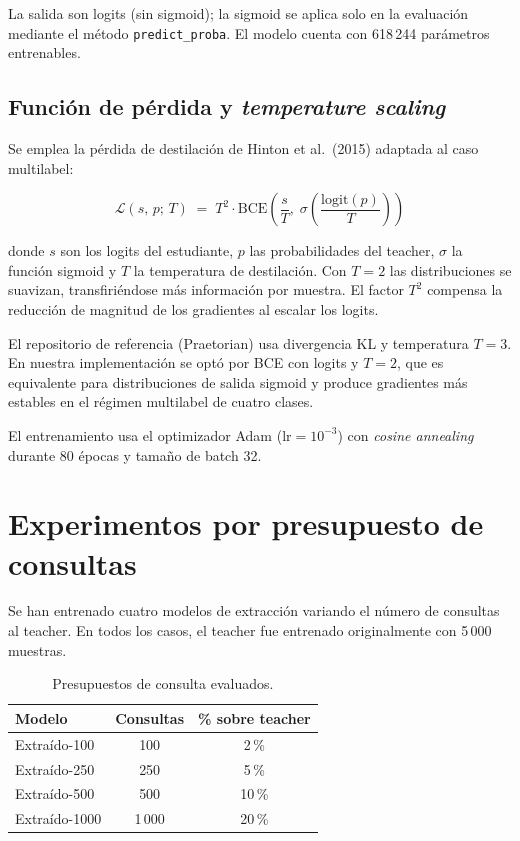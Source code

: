 \documentclass[11pt,a4paper]{article}
\begin{document}
La salida son logits (sin sigmoid); la sigmoid se aplica solo en la evaluación mediante el método \texttt{predict\_proba}. El modelo cuenta con 618\,244 parámetros entrenables.

\subsection{Función de pérdida y \textit{temperature scaling}}

Se emplea la pérdida de destilación de Hinton et al.\ (2015) adaptada al caso multilabel:

\begin{equation}
  \mathcal{L}(s,\, p;\, T) \;=\; T^{2} \cdot \mathrm{BCE}\!\left(\frac{s}{T},\; \sigma\!\left(\frac{\mathrm{logit}(p)}{T}\right)\right)
\end{equation}

donde $s$ son los logits del estudiante, $p$ las probabilidades del teacher, $\sigma$ la función sigmoid y $T$ la temperatura de destilación. Con $T = 2$ las distribuciones se suavizan, transfiriéndose más información por muestra. El factor $T^2$ compensa la reducción de magnitud de los gradientes al escalar los logits.

El repositorio de referencia (Praetorian) usa divergencia KL y temperatura $T = 3$. En nuestra implementación se optó por BCE con logits y $T = 2$, que es equivalente para distribuciones de salida sigmoid y produce gradientes más estables en el régimen multilabel de cuatro clases.

El entrenamiento usa el optimizador Adam ($\text{lr} = 10^{-3}$) con \textit{cosine annealing} durante 80 épocas y tamaño de batch 32.

\section{Experimentos por presupuesto de consultas}

Se han entrenado cuatro modelos de extracción variando el número de consultas al teacher. En todos los casos, el teacher fue entrenado originalmente con 5\,000 muestras.

\begin{table}[h]
  \centering
  \begin{tabular}{lcc}
    \toprule
    \textbf{Modelo} & \textbf{Consultas} & \textbf{\% sobre teacher} \\
    \midrule
    Extraído-100  & 100   & 2\,\%  \\
    Extraído-250  & 250   & 5\,\%  \\
    Extraído-500  & 500   & 10\,\% \\
    Extraído-1000 & 1\,000 & 20\,\% \\
    \bottomrule
  \end{tabular}
  \caption{Presupuestos de consulta evaluados.}
\end{table}
\end{document}
